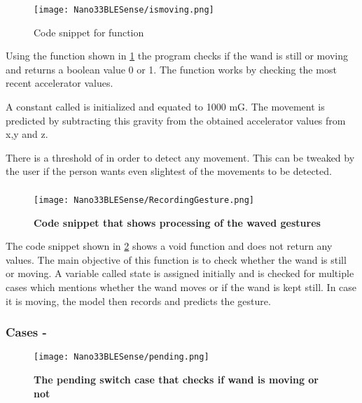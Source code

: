 \begin{figure}[h!]
    \texttt{[image: Nano33BLESense/ismoving.png]}
    \caption{Code snippet for function }
    \label{fig:ismoving()}
\end{figure}


Using the function  shown in \ref{fig:ismoving()} the program checks if the wand is still or moving and returns a boolean value 0 or 1. The function  works by checking the most recent accelerator values. 

A constant called  is initialized and equated to 1000 mG. The movement is predicted by subtracting this gravity from the obtained accelerator values from x,y and z. 

There is a threshold of  in order to detect any movement. This can be tweaked by the user if the person wants even slightest of the movements to be detected. 

\subsubsection{}

\begin{figure}[h!]
    \texttt{[image: Nano33BLESense/RecordingGesture.png]}
    \caption{\textbf{Code snippet that shows processing of the waved gestures}}
    \label{fig:img14}
\end{figure}

The code snippet shown in \ref{fig:img14} shows a void function and does not return any values. The main objective of this function is to check whether the wand is still or moving. A variable called state is assigned initially and is checked for multiple cases which mentions whether the wand moves or if the wand is kept still. In case it is moving, the model then records and predicts the gesture.

\subsubsection{Cases - } 


\begin{figure}[h!]
    \texttt{[image: Nano33BLESense/pending.png]}
    \caption{\textbf{The pending switch case that checks if wand is moving or not}}
    \label{pending}
\end{figure}

